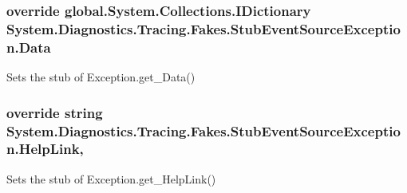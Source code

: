 \hypertarget{class_system_1_1_diagnostics_1_1_tracing_1_1_fakes_1_1_stub_event_source_exception_a639294a2c21ede8d4a744960ebb92546}{
\subsubsection[{Data}]{\setlength{\rightskip}{0pt plus 5cm}override global.\-System.\-Collections.\-I\-Dictionary System.\-Diagnostics.\-Tracing.\-Fakes.\-Stub\-Event\-Source\-Exception.\-Data\hspace{0.3cm}{\ttfamily [get]}}}\label{class_system_1_1_diagnostics_1_1_tracing_1_1_fakes_1_1_stub_event_source_exception_a639294a2c21ede8d4a744960ebb92546}


Sets the stub of Exception.\-get\-\_\-\-Data()

\hypertarget{class_system_1_1_diagnostics_1_1_tracing_1_1_fakes_1_1_stub_event_source_exception_a08042d56f73df826c646e58c01e92ca8}{
\subsubsection[{Help\-Link}]{\setlength{\rightskip}{0pt plus 5cm}override string System.\-Diagnostics.\-Tracing.\-Fakes.\-Stub\-Event\-Source\-Exception.\-Help\-Link\hspace{0.3cm}{\ttfamily [get]}, {\ttfamily [set]}}}\label{class_system_1_1_diagnostics_1_1_tracing_1_1_fakes_1_1_stub_event_source_exception_a08042d56f73df826c646e58c01e92ca8}


Sets the stub of Exception.\-get\-\_\-\-Help\-Link()

